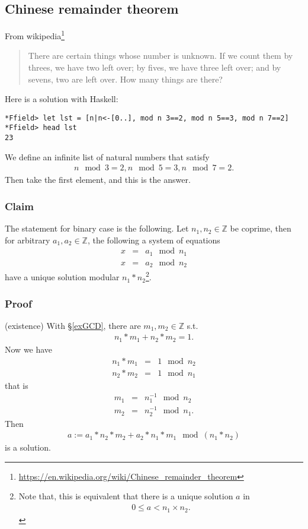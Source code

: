 \documentclass[11pt]{book}
\begin{document}
\subsection{Chinese remainder theorem}
From wikipedia\footnote{
\url{https://en.wikipedia.org/wiki/Chinese_remainder_theorem}
}
\begin{quotation}
There are certain things whose number is unknown. If we count them by threes, we have two left over; by fives, we have three left over; and by sevens, two are left over. How many things are there? 
\end{quotation}
Here is a solution with Haskell:
\begin{verbatim}
*Ffield> let lst = [n|n<-[0..], mod n 3==2, mod n 5==3, mod n 7==2]
*Ffield> head lst
23
\end{verbatim}
We define an infinite list of natural numbers that satisfy
\begin{eqnarray}
n \mod 3 = 2, n \mod 5 = 3, n \mod 7 = 2.
\end{eqnarray}
Then take the first element, and this is the answer.

\subsubsection{Claim}
The statement for binary case is the following.
Let $n_1, n_2 \in \mathbb{Z}$ be coprime, then for arbitrary $a_1,a_2 \in \mathbb{Z}$, the following a system of equations
\begin{eqnarray}
x &=& a_1 \mod n_1\\
x &=& a_2 \mod n_2
\end{eqnarray}
have a unique solution modular $n_1*n_2$\footnote{
Note that, this is equivalent that there is a unique solution $a$ in
\begin{eqnarray}
0 \leq a < n_1\times n_2.
\end{eqnarray}
}.

\subsubsection{Proof}
(existence) With \S\ref{exGCD}, there are $m_1,m_2 \in \mathbb{Z}$ s.t.
\begin{eqnarray}
n_1 * m_1 + n_2 * m_2 = 1.
\end{eqnarray}
Now we have
\begin{eqnarray}
n_1 * m_1 &=& 1 \mod n_2 \\
n_2 * m_2 &=& 1 \mod n_1
\end{eqnarray}
that is
\begin{eqnarray}
m_1 &=& n_1^{-1} \mod n_2 \\
m_2 &=& n_2^{-1} \mod n_1.
\end{eqnarray}
Then
\begin{eqnarray}
a := a_1 * n_2 * m_2 + a_2 * n_1 * m_1 \mod (n_1*n_2)
\end{eqnarray}
is a solution.
\end{document}
